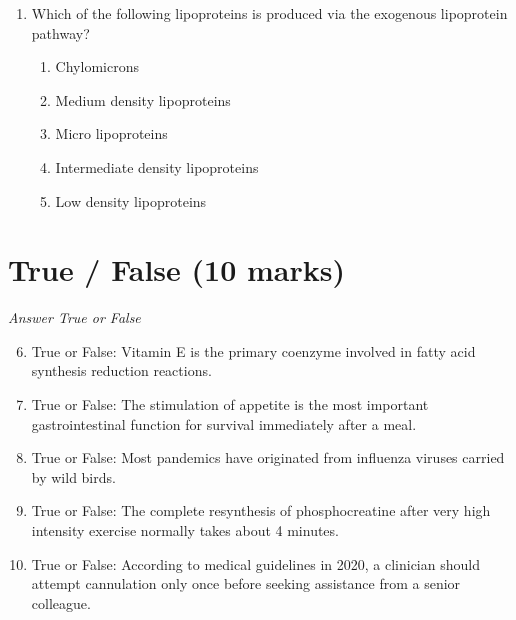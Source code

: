 \documentclass[12pt]{article}
\begin{document}
\begin{enumerate}[label=\arabic*.]
\begin{enumerate}[label=(\alph*)]
    \item One gram of glycerol
    \item One gram of lactose
    \item One gram of fructose
    \item One gram of palmitic acid
    \item One gram of cellulose
\end{enumerate}
\item Which of the following lipoproteins is produced via the exogenous lipoprotein pathway?
\begin{enumerate}[label=(\alph*)]
    \item Chylomicrons
    \item Medium density lipoproteins
    \item Micro lipoproteins
    \item Intermediate density lipoproteins
    \item Low density lipoproteins
\end{enumerate}
\end{enumerate}

\section*{True / False (10 marks)}
\textit{Answer True or False}
\begin{enumerate}[label=\arabic*.]
\setcounter{enumi}{5}
\item True or False: Vitamin E is the primary coenzyme involved in fatty acid synthesis reduction reactions.
\item True or False: The stimulation of appetite is the most important gastrointestinal function for survival immediately after a meal.
\item True or False: Most pandemics have originated from influenza viruses carried by wild birds.
\item True or False: The complete resynthesis of phosphocreatine after very high intensity exercise normally takes about 4 minutes.
\item True or False: According to medical guidelines in 2020, a clinician should attempt cannulation only once before seeking assistance from a senior colleague.
\end{enumerate}
\end{document}
